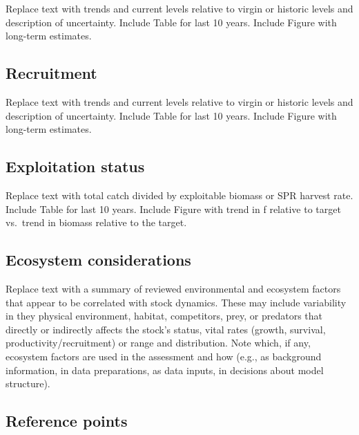 \documentclass[11pt,
  letterpaper,
]{article}
\begin{document}
Replace text with trends and current levels relative to virgin or historic levels and description of uncertainty. Include Table for last 10 years. Include Figure with long-term estimates.

\hypertarget{recruitment}{%
\subsection*{Recruitment}\label{recruitment}}

Replace text with trends and current levels relative to virgin or historic levels and description of uncertainty. Include Table for last 10 years. Include Figure with long-term estimates.

\hypertarget{exploitation-status}{%
\subsection*{Exploitation status}\label{exploitation-status}}

Replace text with total catch divided by exploitable biomass or SPR harvest rate. Include Table for last 10 years. Include Figure with trend in f relative to target vs.~trend in biomass relative to the target.

\hypertarget{ecosystem-considerations}{%
\subsection*{Ecosystem considerations}\label{ecosystem-considerations}}

Replace text with a summary of reviewed environmental and ecosystem factors that appear to be correlated with stock dynamics. These may include variability in they physical environment, habitat, competitors, prey, or predators that directly or indirectly affects the stock's status, vital rates (growth, survival, productivity/recruitment) or range and distribution. Note which, if any, ecosystem factors are used in the assessment and how (e.g., as background information, in data preparations, as data inputs, in decisions about model structure).

\hypertarget{reference-points}{%
\subsection*{Reference points}\label{reference-points}}
\end{document}

